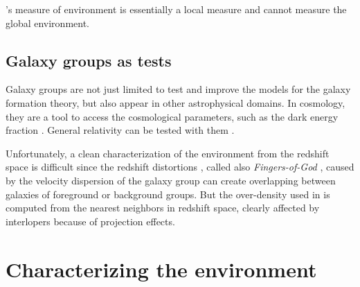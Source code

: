 \cite{Peng+10}'s measure of environment is essentially a local measure and
cannot measure the global environment.
%

\subsection{Galaxy groups as tests}
\label{sub:galaxy_groups_as_tests}

Galaxy groups are not just limited to test and improve the models for the
galaxy formation theory, but also appear in other astrophysical domains. In
cosmology, they are a tool to access the cosmological parameters, such as
the dark energy fraction \citep{Wang+98}. General relativity can be tested
with them \citep{Wojtak+11}.

Unfortunately, a clean characterization of the environment from the redshift
space is difficult since the redshift distortions \citep{Jackson+72}, called
also \emph{Fingers-of-God} \citep{Tully+78}, caused by the velocity dispersion
of the galaxy group can create overlapping between galaxies of foreground or
background groups. But the over-density used in \citet{Peng+10} is computed
from the nearest neighbors in redshift space, clearly affected by interlopers
because of projection effects.

\section{Characterizing the environment}
\label{sec:characterizing_environment}

